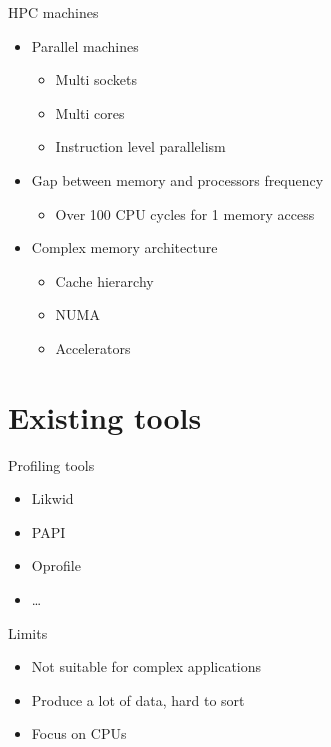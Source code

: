 \documentclass[xcolor={usenames,dvipsnames}]{beamer}
\newcommand{\sectiontitle}{}
\newcommand{\newsection}[1]{\renewcommand{\sectiontitle}{#1}\section{#1}}
\begin{document}
\begin{frame}{HPC machines}
    \begin{itemize}
        \item<1-> Parallel machines
            \begin{itemize}
                \item Multi sockets
                \item Multi cores
                \item Instruction level parallelism
            \end{itemize}
        \item<2-> Gap between memory and processors frequency
            \begin{itemize}
                \item Over 100 CPU cycles for 1 memory access
            \end{itemize}
        \item<3-> Complex memory architecture
            \begin{itemize}
                \item Cache hierarchy
                \item NUMA
                \item Accelerators
            \end{itemize}
    \end{itemize}
\end{frame}

\newsection{Existing tools}

\begin{frame}{Profiling tools}
    \begin{itemize}
        \item Likwid\cite{Treibig10LIKWID}
        \item PAPI \cite{Weaver13PAPI}
        \item Oprofile \cite{Oprofile}
        \item \dots
    \end{itemize}
    \pause
    \begin{alertblock}{Limits}
        \begin{itemize}
            \item Not suitable for complex applications
            \item Produce a lot of data, hard to sort
            \item Focus on CPUs
        \end{itemize}
    \end{alertblock}
\end{frame}
\end{document}
